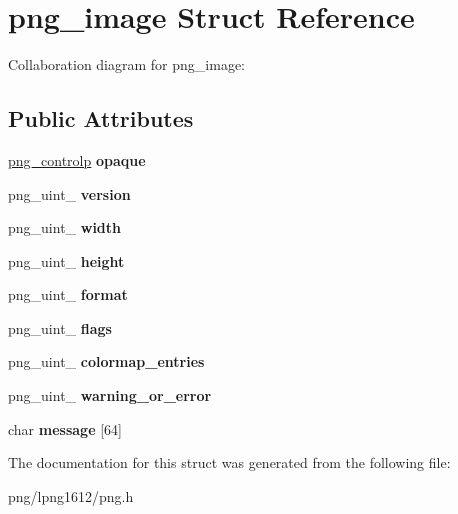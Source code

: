 \hypertarget{structpng__image}{\section{png\+\_\+image Struct Reference}
\label{structpng__image}
}


Collaboration diagram for png\+\_\+image\+:
\subsection*{Public Attributes}
\begin{DoxyCompactItemize}
\item 
\hypertarget{structpng__image_a7b502596648744e2ee0c8788e2c6e918}{\hyperlink{structpng__control}{png\+\_\+controlp} {\bfseries opaque}}\label{structpng__image_a7b502596648744e2ee0c8788e2c6e918}

\item 
\hypertarget{structpng__image_a8c276ba2922051ff0ff9175ab1e23ed1}{png\+\_\+uint\+\_ {\bfseries version}}\label{structpng__image_a8c276ba2922051ff0ff9175ab1e23ed1}

\item 
\hypertarget{structpng__image_a72ec07853c82c632c2d7b3c68c62b659}{png\+\_\+uint\+\_ {\bfseries width}}\label{structpng__image_a72ec07853c82c632c2d7b3c68c62b659}

\item 
\hypertarget{structpng__image_aaf3cb3eb97ee0938a5e870a96fd1fa48}{png\+\_\+uint\+\_ {\bfseries height}}\label{structpng__image_aaf3cb3eb97ee0938a5e870a96fd1fa48}

\item 
\hypertarget{structpng__image_a8a7469310ce4682932b0bc94624f35d1}{png\+\_\+uint\+\_ {\bfseries format}}\label{structpng__image_a8a7469310ce4682932b0bc94624f35d1}

\item 
\hypertarget{structpng__image_ab9519ecd9acf79b507dad566cc3b379f}{png\+\_\+uint\+\_ {\bfseries flags}}\label{structpng__image_ab9519ecd9acf79b507dad566cc3b379f}

\item 
\hypertarget{structpng__image_a48bf1c6518f03da900f41cd9aa5ae5b7}{png\+\_\+uint\+\_ {\bfseries colormap\+\_\+entries}}\label{structpng__image_a48bf1c6518f03da900f41cd9aa5ae5b7}

\item 
\hypertarget{structpng__image_a1b6e296964e81414b0a1cf232ffbcfce}{png\+\_\+uint\+\_ {\bfseries warning\+\_\+or\+\_\+error}}\label{structpng__image_a1b6e296964e81414b0a1cf232ffbcfce}

\item 
\hypertarget{structpng__image_a36b2fdbf312f7b8e025d3c224a746130}{char {\bfseries message} \mbox{[}64\mbox{]}}\label{structpng__image_a36b2fdbf312f7b8e025d3c224a746130}

\end{DoxyCompactItemize}


The documentation for this struct was generated from the following file\+:\begin{DoxyCompactItemize}
\item 
png/lpng1612/png.\+h\end{DoxyCompactItemize}
